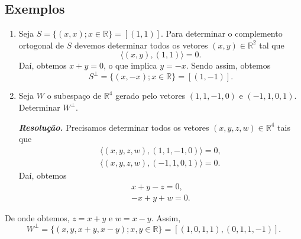 \subsection{Exemplos}

\begin{enumerate}
\item Seja $S=\{ (x,x); x \in \mathbb{R}\}=[(1,1)].$ Para determinar o complemento ortogonal de $S$ devemos determinar todos os vetores $(x,y) \in \mathbb{R}^2$ tal que $$ \langle (x,y), (1,1) \rangle =0.$$  Daí, obtemos $x+y=0$, o que implica $y=-x$. Sendo assim, obtemos $$S^{\perp}=\{ (x,-x); x \in \mathbb{R}\}=[(1,-1)].$$

\item Seja $W$ o subespaço de $\mathbb{R}^4$ gerado pelo vetores $( 1, 1,-1, 0)$ e $(-1, 1, 0,1)$. Determinar  $W^{\perp}$.

\textbf{\textit{Resolução.}} Precisamos determinar todos os vetores $(x, y, z, w) \in \mathbb{R}^4$ tais que
\begin{align*}
\langle (x, y, z, w),  ( 1, 1,-1, 0) \rangle = 0,\\
\langle (x, y, z, w),  (-1, 1, 0,1) \rangle = 0.
\end{align*}
Daí, obtemos
\begin{align*}
 x+ y - z =0,\\
-x+ y+ w = 0.
\end{align*}
\end{enumerate}

De onde obtemos, $z=x+y$ e $w=x-y$. Assim, $$ W^{\perp}=\{(x, y, x+y, x-y); x, y \in \mathbb{R}\}=[(1,0, 1,1),(0,1,1,-1)].$$

